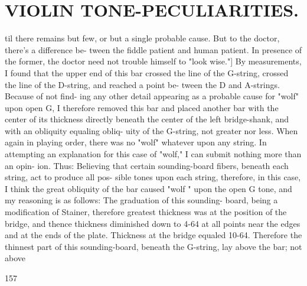 \documentclass{article}
\begin{document}
\section*{VIOLIN TONE-PECULIARITIES.}
til there remains but few, or but a single probable cause. But to the doctor, there's a difference be- tween the fiddle patient and human patient. In presence of the former, the doctor need not trouble himself to "look wise."] By measurements, I found that the upper end of this bar crossed the line of the G-string, crossed the line of the D-string, and reached a point be- tween the D and A-strings. Because of not find- ing any other detail appearing as a probable cause for "wolf" upon open G, I therefore removed this bar and placed another bar with the center of its thickness directly beneath the center of the left bridge-shank, and with an obliquity equaling obliq- uity of the G-string, not greater nor less. When again in playing order, there was no "wolf" whatever upon any string. In attempting an explanation for this case of "wolf," I can submit nothing more than an opin- ion. Thus: Believing that certain sounding-board fibers, beneath each string, act to produce all pos- sible tones upon each string, therefore, in this case, I think the great obliquity of the bar caused "wolf " upon the open G tone, and my reasoning is as follows: The graduation of this sounding- board, being a modification of Stainer, therefore greatest thickness was at the position of the bridge, and thence thickness diminished down to 4-64 at all points near the edges and at the ends of the plate. Thickness at the bridge equaled 10-64. Therefore the thinnest part of this sounding-board, beneath the G-string, lay above the bar; not above

157
\end{document}
